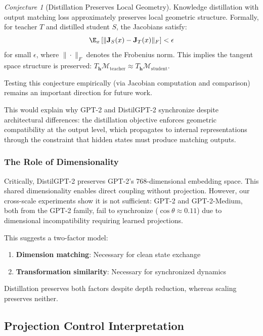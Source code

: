 \documentclass[10pt]{article} %
\theoremstyle{plain}
\theoremstyle{definition}
\theoremstyle{remark}
\newtheorem{conjecture}[theorem]{Conjecture}
\newcommand{\cM}{\mathcal{M}}
\renewcommand{\vect}[1]{\bm{#1}}
\newcommand{\mat}[1]{\mathbf{#1}}
\begin{document}
\begin{conjecture}[Distillation Preserves Local Geometry]
\label{conj:tangent}
Knowledge distillation with output matching loss approximately preserves local geometric structure. Formally, for teacher $T$ and distilled student $S$, the Jacobians satisfy:
\begin{equation}
    \E_x\left[\|\mat{J}_S(x) - \mat{J}_T(x)\|_F\right] < \epsilon
\end{equation}
for small $\epsilon$, where $\|\cdot\|_F$ denotes the Frobenius norm. This implies the tangent space structure is preserved: $T_{\vect{h}}\cM_{\text{teacher}} \approx T_{\vect{h}}\cM_{\text{student}}$.
\end{conjecture}

\noindent Testing this conjecture empirically (via Jacobian computation and comparison) remains an important direction for future work.

This would explain why GPT-2 and DistilGPT-2 synchronize despite architectural differences: the distillation objective enforces geometric compatibility at the output level, which propagates to internal representations through the constraint that hidden states must produce matching outputs.

\subsubsection{The Role of Dimensionality}

Critically, DistilGPT-2 preserves GPT-2's 768-dimensional embedding space. This shared dimensionality enables direct coupling without projection. However, our cross-scale experiments show it is not sufficient: GPT-2 and GPT-2-Medium, both from the GPT-2 family, fail to synchronize ($\cos \theta \approx 0.11$) due to dimensional incompatibility requiring learned projections.

This suggests a two-factor model:
\begin{enumerate}
    \item \textbf{Dimension matching}: Necessary for clean state exchange
    \item \textbf{Transformation similarity}: Necessary for synchronized dynamics
\end{enumerate}

Distillation preserves both factors despite depth reduction, whereas scaling preserves neither.

\subsection{Projection Control Interpretation}
\end{document}
